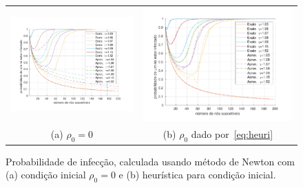     	\begin{figure}[!htb]
    	    \centering
    	    \begin{tabular}{cc}
    	         \hspace{-1.2cm}\includegraphics[width=0.6\columnwidth]{img/exact_approx_v0_lambda10_00_gamma1_52_iter_2_rho0_0.pdf}&
    	         \hspace{-1.2cm}\includegraphics[width=0.6\columnwidth]{img/exact_approx_lambda10_00_gamma1_52_iter_2.pdf}\\
    	         \hspace{-1.2cm}(a) $\rho_{0}=0$ & \hspace{-1.2cm}(b) $\rho_{0}$ dado por~\eqref{eq:heuri} 
    	    \end{tabular}
    	   \caption{Probabilidade de infecção, calculada usando método de Newton com (a)  condição inicial $\rho_0=0$ e (b) heurística para condição inicial.}
    	    \label{fig:rho_exact_approx_newton_rho0_0e1}
    	\end{figure}

